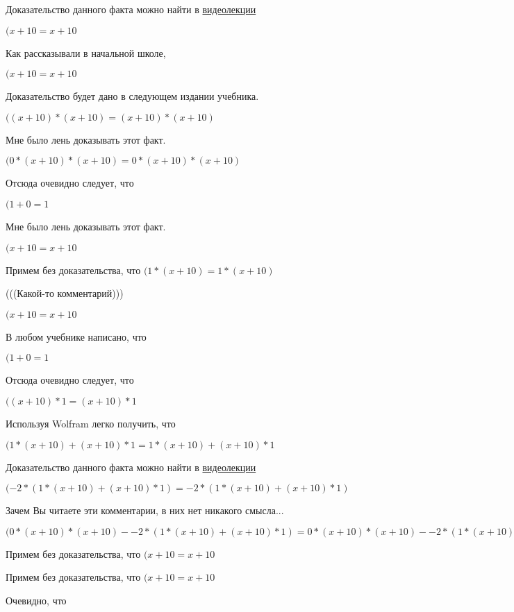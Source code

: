 \documentclass[12pt,a4paper,fleqn]{article}
\theoremstyle{definition}
\begin{document}
Доказательство данного факта можно найти в \href{https://www.youtube.com/watch?v=dQw4w9WgXcQ}{видеолекции}

$( x  +  10  =  x  +  10 $

Как рассказывали в начальной школе,

$( x  +  10  =  x  +  10 $

Доказательство будет дано в следующем издании учебника.

$(( x  +  10 ) * ( x  +  10 ) = ( x  +  10 ) * ( x  +  10 )$

Мне было лень доказывать этот факт.

$( 0  * ( x  +  10 ) * ( x  +  10 ) =  0  * ( x  +  10 ) * ( x  +  10 )$

Отсюда очевидно следует, что

$( 1  +  0  =  1 $

Мне было лень доказывать этот факт.

$( x  +  10  =  x  +  10 $

Примем без доказательства, что
$( 1  * ( x  +  10 ) =  1  * ( x  +  10 )$

(((Какой-то комментарий)))

$( x  +  10  =  x  +  10 $

В любом учебнике написано, что

$( 1  +  0  =  1 $

Отсюда очевидно следует, что

$(( x  +  10 ) *  1  = ( x  +  10 ) *  1 $

Используя Wolfram легко получить, что

$( 1  * ( x  +  10 ) + ( x  +  10 ) *  1  =  1  * ( x  +  10 ) + ( x  +  10 ) *  1 $

Доказательство данного факта можно найти в \href{https://www.youtube.com/watch?v=dQw4w9WgXcQ}{видеолекции}

$( -2  * ( 1  * ( x  +  10 ) + ( x  +  10 ) *  1 ) =  -2  * ( 1  * ( x  +  10 ) + ( x  +  10 ) *  1 )$

Зачем Вы читаете эти комментарии, в них нет никакого смысла...

$( 0  * ( x  +  10 ) * ( x  +  10 ) -  -2  * ( 1  * ( x  +  10 ) + ( x  +  10 ) *  1 ) =  0  * ( x  +  10 ) * ( x  +  10 ) -  -2  * ( 1  * ( x  +  10 ) + ( x  +  10 ) *  1 )$

Примем без доказательства, что
$( x  +  10  =  x  +  10 $

Примем без доказательства, что
$( x  +  10  =  x  +  10 $

Очевидно, что
\end{document}
